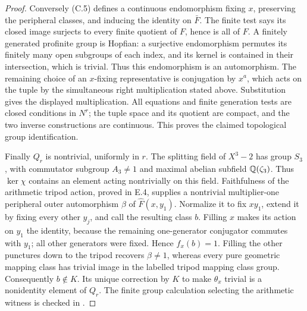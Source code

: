 \begin{proof}
Conversely (C.5) defines a continuous endomorphism fixing $x$, preserving the peripheral classes, and inducing the identity on $\bar F$. The finite test says its closed image surjects to every finite quotient of $F$, hence is all of $F$. A finitely generated profinite group is Hopfian: a surjective endomorphism permutes its finitely many open subgroups of each index, and its kernel is contained in their intersection, which is trivial. Thus this endomorphism is an automorphism. The remaining choice of an $x$-fixing representative is conjugation by $x^a$, which acts on the tuple by the simultaneous right multiplication stated above. Substitution gives the displayed multiplication. All equations and finite generation tests are closed conditions in $N^r$; the tuple space and its quotient are compact, and the two inverse constructions are continuous. This proves the claimed topological group identification.

Finally $Q_r$ is nontrivial, uniformly in $r$. The splitting field of $X^3-2$ has group $S_3$, with commutator subgroup $A_3\ne1$ and maximal abelian subfield $\mathbb Q(\zeta_3)$. Thus $\ker\chi$ contains an element acting nontrivially on this field. Faithfulness of the arithmetic tripod action, proved in E.4, supplies a nontrivial multiplier-one peripheral outer automorphism $\beta$ of $\widehat F(x,y_1)$. Normalize it to fix $xy_1$, extend it by fixing every other $y_j$, and call the resulting class $b$. Filling $x$ makes its action on $y_1$ the identity, because the remaining one-generator conjugator commutes with $y_1$; all other generators were fixed. Hence $f_x(b)=1$. Filling the other punctures down to the tripod recovers $\beta\ne1$, whereas every pure geometric mapping class has trivial image in the labelled tripod mapping class group. Consequently $b\notin K$. Its unique correction by $K$ to make $\theta_x$ trivial is a nonidentity element of $Q_r$. The finite group calculation selecting the arithmetic witness is checked in .
\end{proof}

